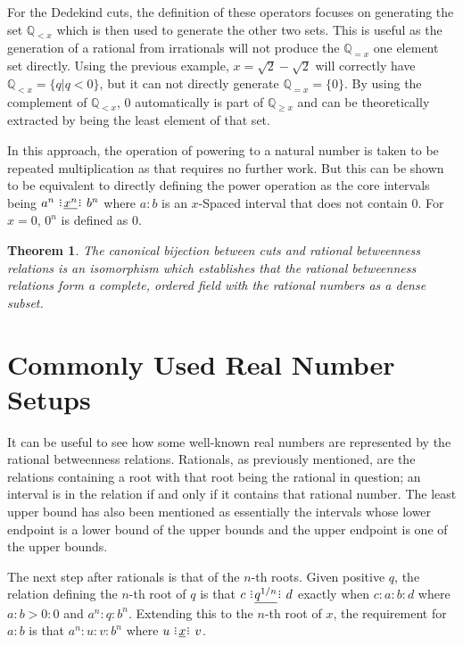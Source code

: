 \documentclass[12pt]{article}
\newtheorem{theorem}{Theorem}
\newcommand{\qcut}[2][x]{\ensuremath{\mathbb{Q}_{#2 #1}}}
\newcommand{\qlt}[1][x]{\qcut[#1]{<}}
\newcommand{\qeq}[1][x]{\qcut[#1]{=}}
\newcommand{\qgeq}[1][x]{\qcut[#1]{\geq}}
\begin{document}
For the Dedekind cuts, the definition of these operators focuses on generating the set $\qlt$ which is then used to generate the other two sets. This is useful as the generation of a rational from irrationals will not produce the $\qeq$ one element set directly. Using the previous example, $ x = \sqrt{2} - \sqrt{2}$ will correctly have $\qlt = \{ q | q < 0\}$, but it can not directly generate $\qeq = \{0\}$. By using the complement of $\qlt$, 0 automatically is part of $\qgeq$ and can be theoretically extracted by being the least element of that set.

In this approach, the operation of powering to a natural number is taken to be repeated multiplication as that requires no further work. But this can be shown to be equivalent to directly defining the power operation as the core intervals being $a^n \xrel[x^n] b^n$ where $a:b$ is an $x$-Spaced interval that does not contain 0. For $x = 0$, $0^n$ is defined as $0$. 


\begin{theorem}
The canonical bijection between cuts and rational betweenness relations is an isomorphism which establishes that the rational betweenness relations form a complete, ordered field with the rational numbers as a dense subset. 
\end{theorem}

\section{Commonly Used Real Number Setups}

It can be useful to see how some well-known real numbers are represented by the rational betweenness relations. Rationals, as previously mentioned, are the relations containing a root with that root being the rational in question; an interval is in the relation if and only if it contains that rational number. The least upper bound has also been mentioned as essentially the intervals whose lower endpoint is a lower bound of the upper bounds and the upper endpoint is one of the upper bounds. 

The next step after rationals is that of the $n$-th roots. Given positive $q$, the relation defining the $n$-th root of $q$ is that $c \xrel[q^{1/n}] d$ exactly when $c:a:b:d$ where $a:b > 0:0$ and  $a^n: q: b^n$. Extending this to the $n$-th root of $x$, the requirement for $a : b$ is that $a^n:u:v:b^n$ where $u \xrel v$. 
\end{document}
